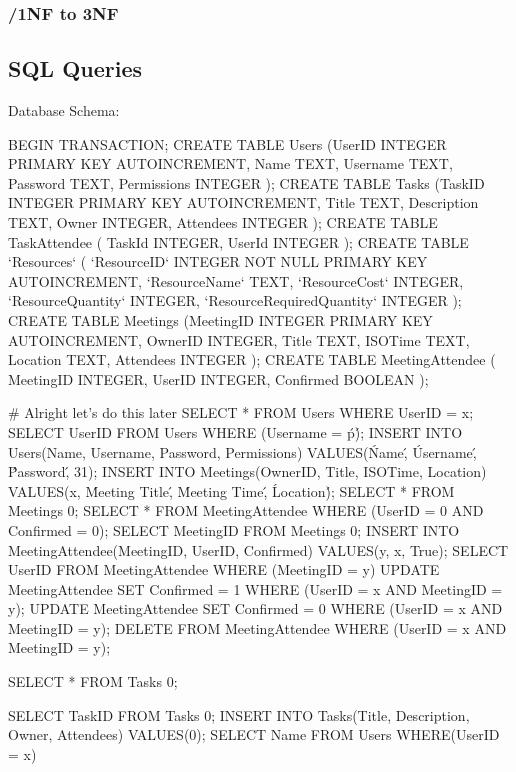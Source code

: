 \subsubsection{/1NF to 3NF}


\subsection{SQL Queries}

    Database Schema:
\begin{sql}
    BEGIN TRANSACTION;
CREATE TABLE Users
                (UserID INTEGER PRIMARY KEY AUTOINCREMENT,
                Name TEXT,
                Username TEXT,
                Password TEXT,
                Permissions INTEGER
                );
CREATE TABLE Tasks
                (TaskID INTEGER PRIMARY KEY AUTOINCREMENT,
                Title TEXT,
                Description TEXT,
                Owner INTEGER,
                Attendees INTEGER
                );
CREATE TABLE TaskAttendee
                (
                TaskId INTEGER,
                UserId INTEGER
                );
CREATE TABLE `Resources` (
	`ResourceID`	INTEGER NOT NULL PRIMARY KEY AUTOINCREMENT,
	`ResourceName`	TEXT,
	`ResourceCost`	INTEGER,
	`ResourceQuantity`	INTEGER,
	`ResourceRequiredQuantity`	INTEGER
);
CREATE TABLE Meetings
                (MeetingID INTEGER PRIMARY KEY AUTOINCREMENT,
                OwnerID INTEGER,
                Title TEXT,
                ISOTime TEXT,
                Location TEXT,
                Attendees INTEGER
                );
CREATE TABLE MeetingAttendee
(
    MeetingID INTEGER,
    UserID INTEGER,
    Confirmed BOOLEAN
);


# Alright let's do this later
SELECT * FROM Users WHERE UserID = x;
SELECT UserID FROM Users WHERE (Username = \'p\');
INSERT INTO Users(Name, Username, Password, Permissions) VALUES(\'Name\', \'Username\', \'Password\', 31);
INSERT INTO Meetings(OwnerID, Title, ISOTime, Location) VALUES(x, \'Meeting Title\', \'Meeting Time\',  \'Location\');
SELECT * FROM Meetings {0};
SELECT * FROM MeetingAttendee WHERE (UserID = {0} AND Confirmed = 0);
SELECT MeetingID FROM Meetings {0};
INSERT INTO MeetingAttendee(MeetingID, UserID, Confirmed) VALUES(y, x, True);
SELECT UserID FROM MeetingAttendee WHERE (MeetingID = y)
UPDATE MeetingAttendee SET Confirmed = 1 WHERE (UserID = x AND MeetingID = y);
UPDATE MeetingAttendee SET Confirmed = 0 WHERE (UserID = x AND MeetingID = y);
DELETE FROM MeetingAttendee WHERE (UserID = x AND MeetingID = y);

SELECT * FROM Tasks {0};

SELECT TaskID FROM Tasks {0};
INSERT INTO Tasks(Title, Description, Owner, Attendees) VALUES({0});
SELECT Name FROM Users WHERE(UserID = x)

\end{sql}


